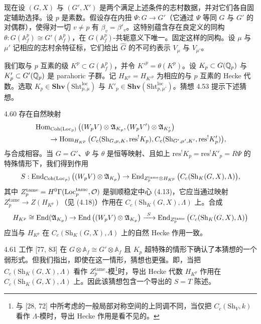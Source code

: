 现在设 $(G,X)$ 与 $(G',X')$ 是两个满足上述条件的志村数据，并对它们各自固定辅助选择。设 $p$ 是素数。假设存在内扭 $\Psi:G\to G'$（它通过 $\Psi$ 等同 $G$ 与 $G'$ 的对偶群），使得对一切 $v\ne p$ 有 $\beta_v=\beta'_v$。这特别蕴含存在良定义的同构 $\theta:G(\mathbb A^p_f)\cong G'(\mathbb A^p_f)$，在 $G(\mathbb A^p_f)$-共轭意义下唯一。固定这样的同构。设 $\mu$ 与 $\mu'$ 记相应的志村余特征标，它们给出 $\hat G$ 的不可约表示 $V_\mu$ 与 $V_{\mu'}$。

我们取与 $p$ 互素的级 $K^p\subset G(\mathbb A^p_f)$，并令 $K'^p=\theta(K^p)$。设 $K_p\subset G(\mathbb{Q}_p)$ 与 $K'_p\subset G'(\mathbb{Q}_p)$ 是 parahoric 子群。记 $H_{K^p}=H_{K'^p}$ 为相应的与 $p$ 互素的 Hecke 代数。选取 $K_p\in\mathbf{Shv}(\mathrm{Sht}^{\mathrm{loc}}_{p,\mu})$ 与 $K'_p\in\mathbf{Shv}(\mathrm{Sht}^{\mathrm{loc}}_{p,\mu'})$。猜想 4.53 提示下述猜想。

\begin{conj}{4.60}\label{thm:a2-4-60}
存在自然映射
\[
\begin{aligned}
&\operatorname{Hom}_{\operatorname{Coh}(\operatorname{Loc}_p)}\big((W_pV)\otimes\mathfrak A_{K_p},(W_pV')\otimes\mathfrak A_{K'_p}\big)\\
&\qquad\to\operatorname{Hom}_{H_{K^p}}\big(C_c(\mathrm{Sh}_{G,\mu,K},\mathrm{res}^!K_p),C_c(\mathrm{Sh}_{G',\mu',K'},\mathrm{res}^!K'_p)\big),
\end{aligned}
\]
与合成相容。当 $G=G'$、$\Psi$ 与 $\theta$ 是恒等映射、且如上 $\mathrm{res}^!K_p=\mathrm{res}^!K'_p=R\Psi$ 的特殊情形下，我们得到作用
\[
S:\operatorname{End}_{\operatorname{Coh}(\operatorname{Loc}_p)}\big((W_pV)\otimes\mathfrak A_{K_p}\big)\to\operatorname{End}_{Z^{\mathrm{tame}}_p\otimes H_{K^p}}\big(C_c(\mathrm{Sh}_K(G,X),\Lambda)\big),
\]
其中 $Z^{\mathrm{tame}}_p=H^0\Gamma(\operatorname{Loc}^{\mathrm{tame}}_p,\mathcal O)$ 是驯顺稳定中心 (4.13)，它应当通过映射 $Z^{\mathrm{tame}}_p\to Z(H_{K^p})$（见 (4.18)）作用在 $C_c(\mathrm{Sh}_K(G,X),\Lambda)$ 上。合成
\[
H_{K^p}\cong\End(\mathfrak A_{K_p})\to\End\big((W_pV)\otimes\mathfrak A_{K_p}\big)\xrightarrow{\ S\ }\End_{Z^{\mathrm{tame}}_p}\big(C_c(\mathrm{Sh}_K(G,X),\Lambda)\big)
\]
应当与 $H_{K^p}$ 在 $C_c(\mathrm{Sh}_K(G,X),\Lambda)$ 上的自然 Hecke 作用一致。
\end{conj}

\begin{rem}{4.61}\label{thm:a2-4-61}
工作 [77, 83] 在 $G\otimes\mathbb A_f\cong G'\otimes\mathbb A_f$ 且 $K_p$ 超特殊的情形下确认了本猜想的一个弱形式。但我们指出，即使在这一情形，猜想也更强。即，当把 $C_c(\mathrm{Sh}_K(G,X),\Lambda)$ 看作 $Z^{\mathrm{tame}}_p$-模\footnote{与 [28, 72] 中所考虑的一般局部对称空间的上同调不同，当仅把 $C_c(\mathrm{Sh}_V,k)$ 看作 $\Lambda$-模时，导出 Hecke 作用是看不见的。}时，导出 Hecke 代数 $H_{K^p}$ 作用在 $C_c(\mathrm{Sh}_K(G,X),\Lambda)$ 上。因此该猜想包含一个导出的 $S=T$ 陈述。
\end{rem}

